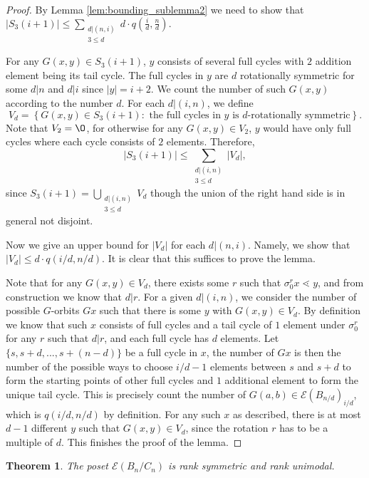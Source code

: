 \documentclass[10 pt]{amsart}
\theoremstyle{plain}
\newtheorem{thm}{Theorem}[section]
\theoremstyle{definition}
\theoremstyle{remark}
\numberwithin{equation}{section}
\begin{document}
\begin{proof} 


By Lemma \ref{lem:bounding_sublemma2} we need to show that $\displaystyle |S_3(i+1)| \le \sum_{\substack{d | (n , i) \\ 3 \le d }} d \cdot q \left(\frac{i}{d},\frac{n}{d}\right)  .$ 


For any $G(x, y) \in S_3(i+1)$, $y$ consists of several full cycles with $2$ addition element being its tail cycle. The full cycles in $y$ are $d$ rotationally symmetric for some $d | n$ and $d | i$ since $|y| = i+2$. We count the number of such $G(x,y)$ according to the number $d$. For each $d| (i, n)$, we define $$V_d = \left\{G(x, y) \in S_3(i+1) : \text{ the full cycles in $y$ is $d$-rotationally symmetric} \right\}.$$ Note that $V_2 = \O$, for otherwise for any $G(x, y) \in V_2$, $y$ would have only full cycles where each cycle consists of $2$ elements. Therefore, $$|S_3(i+1)| \le \displaystyle \sum_{\substack{d| (i, n) \\ 3 \le d}} |V_d|,$$ since $S_3(i+1) = \bigcup_{\substack{d| (i, n) \\ 3 \le d}} V_d$ though the union of the right hand side is in general not disjoint. 

Now we give an upper bound for $|V_d|$ for each $d | (n, i)$. Namely, we show that $|V_d| \le d \cdot q (i/d, n/d)$. It is clear that this suffices to prove the lemma.

Note that for any $G(x, y) \in V_d$, there exists some $r$ such that $\sigma_0^r x \lessdot y$, and from construction we know that $d | r$. For a given $d | (i, n)$, we consider the number of possible $G$-orbits $Gx$ such that there is some $y$ with $G(x, y) \in V_d$. By definition we know that such $x$ consists of full cycles and a tail cycle of $1$ element under $\sigma_0^r$ for any $r$ such that $d |r$, and each full cycle has $d$ elements. Let $\{s, s+d, ..., s+(n-d)\}$ be a full cycle in $x$, the number of $Gx$ is then the number of the possible ways to choose $i/d -1$ elements between $s$ and $s+d$ to form the starting points of other full cycles and $1$ additional element to form the unique tail cycle. This is precisely count the number of $G(a,b) \in \mathcal E (B_{n/d})_{i/d}$, which is $q(i/d, n/d)$ by definition. For any such $x$ as described, there is at most $d-1$ different $y$ such that $G(x,y) \in V_d$, since the rotation $r$ has to be a multiple of $d$. This finishes the proof of the lemma.
\end{proof}


\begin{thm}{\label{cor:cyclic_unimodal}} 
The poset $\mathcal E(B_n/C_n)$ is rank symmetric and rank unimodal.
\end{thm}
\end{document}
